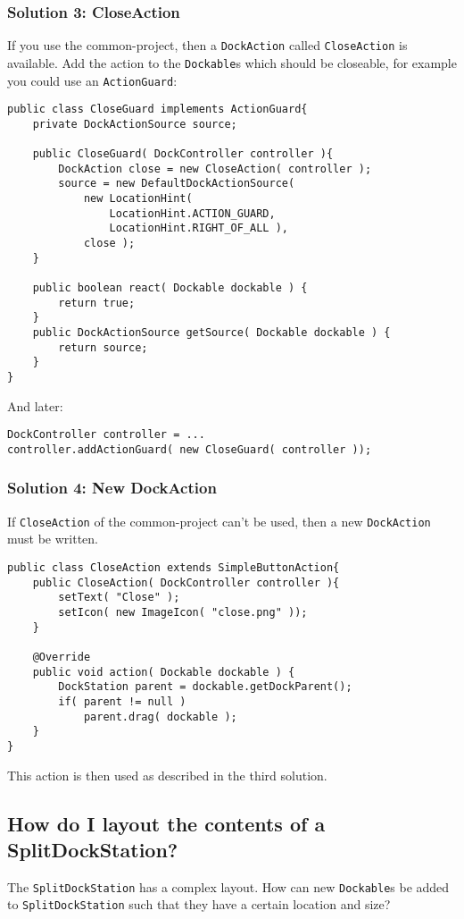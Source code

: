 \documentclass[a4paper,10pt]{article}
\newcommand{\src}[1]{\lstinline[basicstyle=\normalsize\ttfamily,keywordstyle=\normalsize\ttfamily,identifierstyle=\normalsize\ttfamily]|#1|}
\begin{document}
\subsubsection{Solution 3: CloseAction}
If you use the common-project, then a \src{DockAction} called \src{CloseAction} is available. Add the action to the \src{Dockable}s which should be closeable, for example you could use an \src{ActionGuard}:
\begin{lstlisting}
public class CloseGuard implements ActionGuard{
	private DockActionSource source;
    
	public CloseGuard( DockController controller ){
		DockAction close = new CloseAction( controller );
		source = new DefaultDockActionSource(
			new LocationHint(
				LocationHint.ACTION_GUARD,
				LocationHint.RIGHT_OF_ALL ),
			close );
	}

	public boolean react( Dockable dockable ) {
		return true;
	}
	public DockActionSource getSource( Dockable dockable ) {
		return source;
	}
}
\end{lstlisting}
And later:
\begin{lstlisting}
DockController controller = ...
controller.addActionGuard( new CloseGuard( controller ));
\end{lstlisting}

\subsubsection{Solution 4: New DockAction}
If \src{CloseAction} of the common-project can't be used, then a new \src{DockAction} must be written.
\begin{lstlisting}
public class CloseAction extends SimpleButtonAction{
	public CloseAction( DockController controller ){
		setText( "Close" );
		setIcon( new ImageIcon( "close.png" ));
	}

	@Override
	public void action( Dockable dockable ) {
		DockStation parent = dockable.getDockParent();
		if( parent != null )
			parent.drag( dockable );
	}
}
\end{lstlisting}
This action is then used as described in the third solution.

\subsection{How do I layout the contents of a SplitDockStation?}
The \src{SplitDockStation} has a complex layout. How can new \src{Dockable}s be added to \src{SplitDockStation} such that they have a certain location and size?
\end{document}
